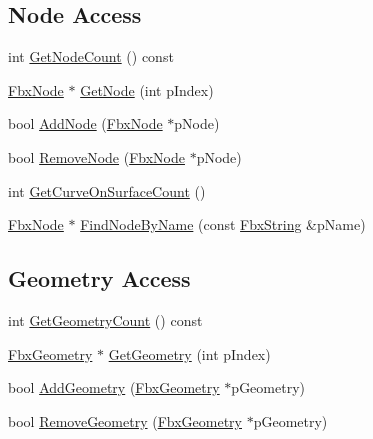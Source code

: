 \subsection*{Node Access}
\begin{DoxyCompactItemize}
\item 
int \hyperlink{class_fbx_scene_a0cb1a1464b0fa1b8291c41900879515e}{Get\+Node\+Count} () const
\item 
\hyperlink{class_fbx_node}{Fbx\+Node} $\ast$ \hyperlink{class_fbx_scene_a1ba0a3d043284ae7c488467feaf1a9f9}{Get\+Node} (int p\+Index)
\item 
bool \hyperlink{class_fbx_scene_a4da84de06d868fd3542f4688834dff6d}{Add\+Node} (\hyperlink{class_fbx_node}{Fbx\+Node} $\ast$p\+Node)
\item 
bool \hyperlink{class_fbx_scene_a2e66ac740f8ff46ef58d0fb3dbbe5c65}{Remove\+Node} (\hyperlink{class_fbx_node}{Fbx\+Node} $\ast$p\+Node)
\item 
int \hyperlink{class_fbx_scene_a7dd5c89cc0d60a42ce504b2593f781cb}{Get\+Curve\+On\+Surface\+Count} ()
\item 
\hyperlink{class_fbx_node}{Fbx\+Node} $\ast$ \hyperlink{class_fbx_scene_ad0efe7531b777c959c690f57a3052706}{Find\+Node\+By\+Name} (const \hyperlink{class_fbx_string}{Fbx\+String} \&p\+Name)
\end{DoxyCompactItemize}
\subsection*{Geometry Access}
\begin{DoxyCompactItemize}
\item 
int \hyperlink{class_fbx_scene_aab367e33255510f9a6db9b8b56efc873}{Get\+Geometry\+Count} () const
\item 
\hyperlink{class_fbx_geometry}{Fbx\+Geometry} $\ast$ \hyperlink{class_fbx_scene_a66fc27092b1511bc91bb8c73352b066c}{Get\+Geometry} (int p\+Index)
\item 
bool \hyperlink{class_fbx_scene_a43871135355dec7e9eb2070b93e61423}{Add\+Geometry} (\hyperlink{class_fbx_geometry}{Fbx\+Geometry} $\ast$p\+Geometry)
\item 
bool \hyperlink{class_fbx_scene_a9bbff92d4739c1a39489c8b9178e51b4}{Remove\+Geometry} (\hyperlink{class_fbx_geometry}{Fbx\+Geometry} $\ast$p\+Geometry)
\end{DoxyCompactItemize}
